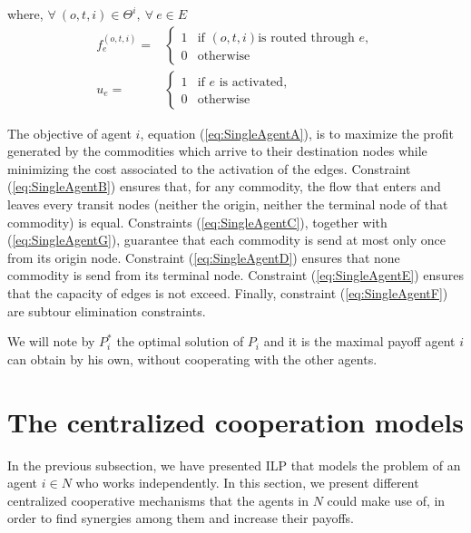 \documentclass[review]{elsarticle}
\begin{document}
where, $\forall\ (o,t,i)\in \Theta^i,\  \forall\ e \in E$
\[
\begin{array}{rl}
f_e^{(o,t,i)} = & \begin{cases}
    1 & \text{if } (o,t,i) \text{is routed through } e,\\
    0 & \text{otherwise}
\end{cases}  \\[20pt]
u_e = &\begin{cases}
    1 & \text{if } e \text{ is activated},\\
    0 & \text{otherwise}    
\end{cases}
\end{array}
\]

The objective of agent $i$, equation (\ref{eq:SingleAgentA}), is to maximize the
profit generated by the commodities which arrive to their destination nodes
while minimizing the cost associated to the activation of the edges. Constraint
(\ref{eq:SingleAgentB}) ensures that, for any commodity, the flow that enters
and leaves every transit nodes (neither the origin, neither the terminal node of
that commodity) is equal. Constraints (\ref{eq:SingleAgentC}), together with
(\ref{eq:SingleAgentG}), guarantee that each commodity is send at most only once
from its origin node. Constraint (\ref{eq:SingleAgentD}) ensures that none
commodity is send from its terminal node. Constraint (\ref{eq:SingleAgentE})
ensures that the capacity of edges is not exceed. Finally, constraint
(\ref{eq:SingleAgentF}) are subtour elimination constraints.

We will note by $P_i^*$ the optimal solution of $P_i$ and it is the maximal
payoff agent $i$ can obtain by his own, without cooperating with the other agents.

\section{The centralized cooperation models}

In the previous subsection, we have presented ILP that models the problem
of an agent $i\in N$ who works independently. In this section, we present
different centralized cooperative mechanisms that the agents in $N$ could make
use of, in order to find synergies among them and increase their payoffs.
\end{document}

